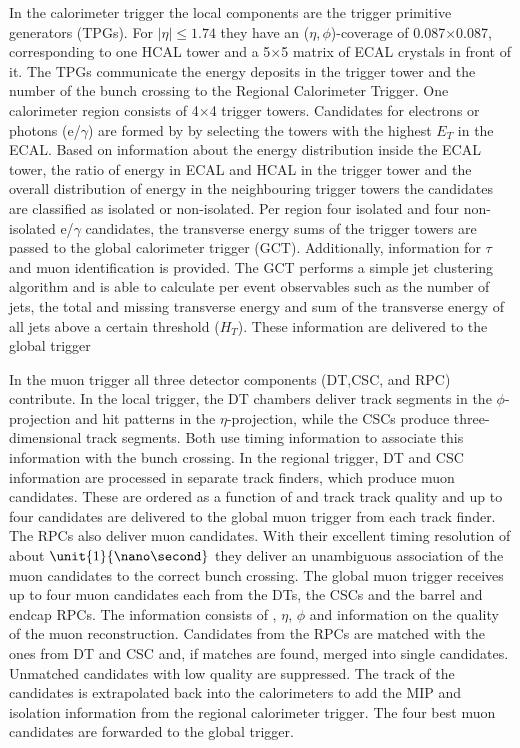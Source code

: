 In the calorimeter trigger the local components are the trigger primitive generators (TPGs). For $\vert \eta \vert \leq 1.74$ they have an ($\eta,\phi$)-coverage of 0.087$\times$0.087, corresponding to one HCAL tower and a 5$\times$5 matrix of ECAL crystals in front of it. The TPGs communicate the energy deposits in the trigger tower and the number of the bunch crossing to the Regional Calorimeter Trigger. One calorimeter region consists of 4$\times$4 trigger towers. Candidates for electrons or photons (e/$\gamma$) are formed by by selecting the towers with the highest $E_T$ in the ECAL. Based on information about the energy distribution inside the ECAL tower, the ratio of energy in ECAL and HCAL in the trigger tower and the overall distribution of energy in the neighbouring trigger towers the candidates are classified as isolated or non-isolated. Per region four isolated and four non-isolated e/$\gamma$ candidates, the transverse energy sums of the trigger towers are passed to the global calorimeter trigger (GCT). Additionally, information for $\tau$ and muon identification is provided. The GCT performs a simple jet clustering algorithm and is able to calculate per event observables such as the number of jets, the total and missing transverse energy and sum of the transverse energy of all jets above a certain threshold ($H_T$). These information are delivered to the global trigger

In the muon trigger all three detector components (DT,CSC, and RPC) contribute. In the local trigger, the DT chambers deliver track segments in the $\phi$-projection and hit patterns in the $\eta$-projection, while the CSCs produce three-dimensional track segments. Both use timing information to associate this information with the bunch crossing. In the regional trigger, DT and CSC information are processed in separate track finders, which produce muon candidates. These are ordered as a function of \pt and track track quality and up to four candidates are delivered to the global muon trigger from each track finder. The RPCs also deliver muon candidates. With their excellent timing resolution of about $\unit{1}{\nano\second}$ they deliver an unambiguous association of the muon candidates to the correct bunch crossing. The global muon trigger receives up to four muon candidates each from the DTs, the CSCs and the barrel and endcap RPCs. The information consists of \pt, $\eta$, $\phi$ and information on the quality of the muon reconstruction. Candidates from the RPCs are matched with the ones from DT and CSC and, if matches are found, merged into single candidates. Unmatched candidates with low quality are suppressed. The track of the candidates is extrapolated back into the calorimeters to add the MIP and isolation information from the regional calorimeter trigger. The four best muon candidates are forwarded to the global trigger. 

